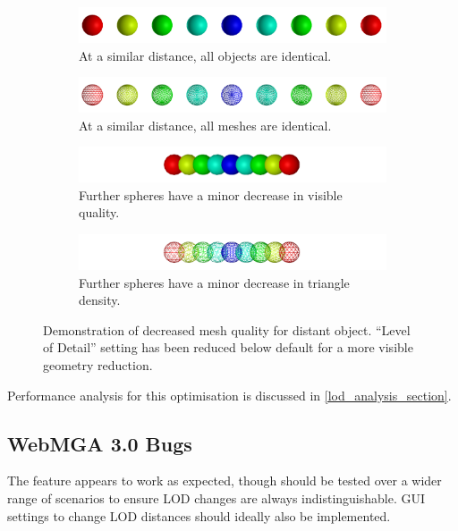 \begin{figure}
  \begin{center}
    \begin{subfigure}{\textwidth}
      \includegraphics[width=\textwidth]{assets/images/lod/a}
      \caption{At a similar distance, all objects are identical.}
      \label{fig:lod_a}
    \end{subfigure}
    \begin{subfigure}{\textwidth}
      \includegraphics[width=\textwidth]{assets/images/lod/a_w}
      \caption{At a similar distance, all meshes are identical.}
      \label{fig:lod_a_w}
    \end{subfigure}
    \begin{subfigure}{\textwidth}
      \includegraphics[width=\textwidth]{assets/images/lod/b}
      \caption{Further spheres have a minor decrease in visible quality.}
      \label{fig:lod_b}
    \end{subfigure}
    \begin{subfigure}{\textwidth}
      \includegraphics[width=\textwidth]{assets/images/lod/b_w}
      \caption{Further spheres have a minor decrease in triangle density.}
      \label{fig:lod_b_w}
    \end{subfigure}
  \end{center}
  \caption{Demonstration of decreased mesh quality for distant object. ``Level of Detail'' setting has been reduced below default for a more visible geometry reduction.}
  \label{fig:lod_spin}
\end{figure}

Performance analysis for this optimisation is discussed in \cref{lod_analysis_section}.
\subsection{WebMGA 3.0 Bugs}
The feature appears to work as expected, though should be tested over a wider range of scenarios to ensure LOD changes are always indistinguishable. GUI settings to change LOD distances should ideally also be implemented.
